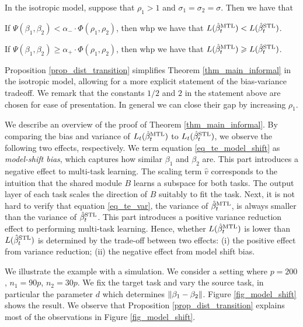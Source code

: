 \begin{proposition}\label{prop_dist_transition}
	In the isotropic model, suppose that $\rho_1 > 1$ and $\sigma_1 = \sigma_2 = \sigma$.
	Then we have that
	\squishlist
		\item If $\Psi(\beta_1, \beta_2) < \alpha_{-} \cdot \Phi(\rho_1, \rho_2)$, then whp we have that $L(\hat{\beta}_t^{\text{MTL}}) < L(\hat{\beta}_t^{\text{STL}})$.
		\item If $\Psi(\beta_1, \beta_2) \ge \alpha_{+} \cdot \Phi(\rho_1, \rho_2)$, then whp we have that $L(\hat{\beta}_t^{\text{MTL}}) \geqslant L(\hat{\beta}_t^{\text{STL}})$.
	\squishend
\end{proposition}

Proposition \ref{prop_dist_transition} simplifies Theorem \ref{thm_main_informal} in the isotropic model, allowing for a more explicit statement of the bias-variance tradeoff.
We remark that the constants $1/2$ and $2$ in the statement above are chosen for ease of presentation.
In general we can close their gap by increasing $\rho_1$.

We describe an overview of the proof of Theorem \ref{thm_main_informal}.
By comparing the bias and variance of $L_t(\hat{\beta}_t^{\text{MTL}})$ to $L_t(\hat{\beta}_t^{\text{STL}})$, we observe the following two effects, respectively.
We term equation \eqref{eq_te_model_shift} as \textit{model-shift bias}, which captures how similar $\beta_1$ and $\beta_2$ are.
This part introduces a negative effect to multi-task learning.
The scaling term $\hat{v}$ corresponds to the intuition that the shared module $B$ learns a subspace for both tasks.
The output layer of each task scales the direction of $B$ suitably to fit the task.
Next, it is not hard to verify that equation \eqref{eq_te_var}, the variance of $\hat{\beta}_t^{\text{MTL}}$, is always smaller than the variance of $\hat{\beta}_t^{\text{STL}}$.
This part introduces a positive variance reduction effect to performing multi-task learning.
Hence, whether $L(\hat{\beta}_t^{\text{MTL}})$ is lower than $L(\hat{\beta}_t^{\text{STL}})$ is determined by the trade-off between two effects:
(i) the positive effect from variance reduction;
(ii) the negative effect from model shift bias.

\todo{} We illustrate the example with a simulation.
We consider a setting where $p = 200$, $n_1 = 90p$, $n_2 = 30p$.
We fix the target task and vary the source task, in particular the parameter $d$ which determines $\|\beta_1 - \beta_2\|$.
Figure \ref{fig_model_shift} shows the result.
We observe that Proposition \ref{prop_dist_transition} explains most of the observations in Figure \ref{fig_model_shift}.

